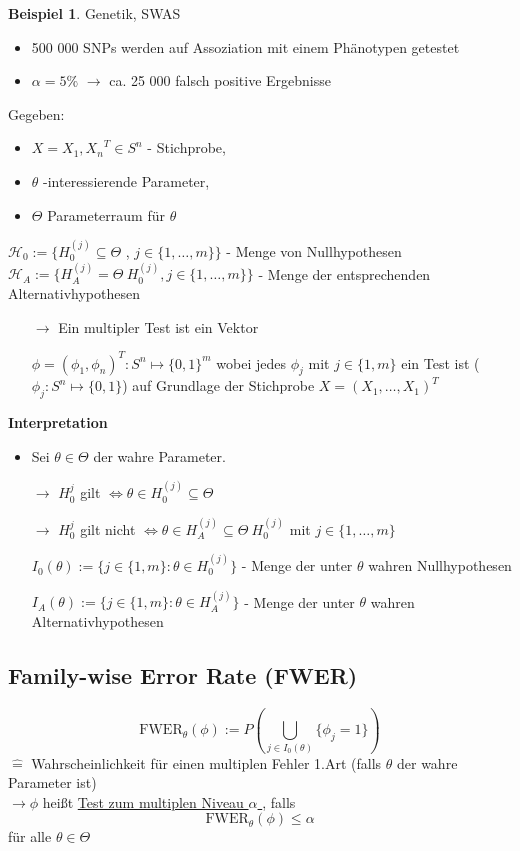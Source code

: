 \documentclass[10pt]{report}
\theoremstyle{definition}
\newtheorem{exmp}{Beispiel}
\begin{document}
\begin{exmp}
	Genetik, SWAS
	\begin{itemize}
		\item 500 000 SNPs werden auf Assoziation mit einem Phänotypen getestet
		\item $\alpha = 5\%$ $\rightarrow$ ca. 25 000 falsch positive Ergebnisse
	\end{itemize}
\end{exmp}
Gegeben:
\begin{itemize}
	\item $X= {X_1, X_n}^T \in S^n$ - Stichprobe,
	\item $\theta$ -interessierende Parameter,
	\item $\Theta$ Parameterraum für $\theta$
\end{itemize}
$\mathcal{H}_0 := \{ H_0^{(j)} \subseteq \Theta$ , $j \in \{1, \ldots, m\} \}$ - Menge von Nullhypothesen\\
$\mathcal{H}_A := \{ H_A^{(j)} = \Theta \ H_0^{(j)} , j \in \{1, \ldots, m\}\}$ - Menge der entsprechenden Alternativhypothesen
\begin{itemize}
	\item[$\rightarrow$] Ein multipler Test ist ein Vektor 
	\item[]$\phi = (\phi_1, \phi_n)^T: S^n \mapsto \{0,1\}^m$ 
wobei jedes $\phi_j$ mit $j \in \{1,m\}$ ein Test ist ($\phi_j: S^n \mapsto \{0,1\}$) auf Grundlage der Stichprobe $X = (X_1,\ldots, X_1)^T$
\end{itemize}
\textbf{Interpretation}
\begin{itemize}
	\item Sei $\theta \in \Theta$ der wahre Parameter.
	\item[$\rightarrow$] $H_0^{j}$  gilt $\Leftrightarrow \theta \in H_0^{(j)} \subseteq \Theta$
	\item[$\rightarrow$] $H_0^{j}$ gilt nicht $\Leftrightarrow \theta \in H_A^{(j)} \subseteq \Theta \ H_0^{(j)} $
mit $j \in \{1,\ldots,m\}$
	\item[]$I_0(\theta) := \{j \in \{1,m\} : \theta \in H_0^{(j)} \}$ - Menge der unter $\theta$ wahren Nullhypothesen
	\item[]$I_A(\theta) := \{j \in \{1,m\} : \theta \in H_A^{(j)} \}$ - Menge der unter $\theta$ wahren Alternativhypothesen
\end{itemize}


\subsection{Family-wise Error Rate (FWER) }
\[ \text{FWER}_{\theta}(\phi)  := P \left( \bigcup_{j\in I_{0}(\theta)} \{ \phi_j = 1\} \right) \]
$\mathrel{\widehat{=}}$ Wahrscheinlichkeit für einen multiplen Fehler 1.Art (falls $\theta$ der wahre Parameter ist) \\
$\rightarrow \phi$ heißt \underline{Test zum multiplen Niveau $\alpha$ }, falls
\[ \text{FWER}_{\theta}(\phi) \leq \alpha \]
für alle $\theta \in \Theta $
\end{document}
